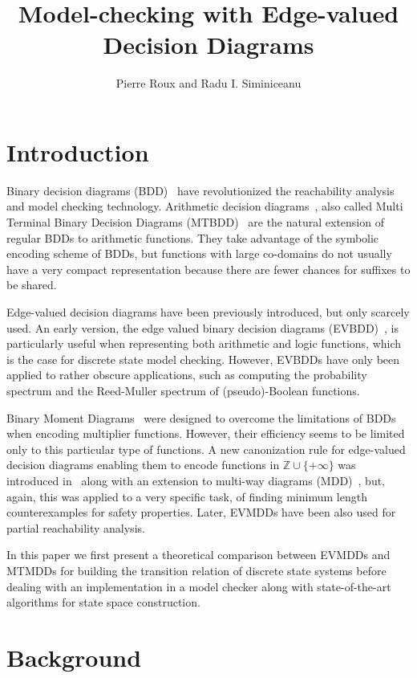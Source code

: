 \documentclass[nocover]             %
{NASA}                       %
\title{Model-checking with Edge-valued Decision Diagrams}
\author{Pierre Roux and Radu I. Siminiceanu}
\newcommand{\Z}{\mathbb{Z}}
\begin{document}
\section{Introduction}

Binary decision diagrams (BDD)~\cite{Bryant1986} have revolutionized the 
reachability analysis and model checking technology.
%
Arithmetic decision diagrams~\cite{Somenzi1993}, also called
Multi Terminal Binary Decision Diagrams (MTBDD)~\cite{Clarke1995} are the 
natural extension of regular BDDs to arithmetic functions.
They take advantage of the symbolic encoding scheme of BDDs, but 
functions with large co-domains do not usually have a very compact 
representation because there are fewer chances for suffixes to be shared.

Edge-valued decision diagrams have been previously introduced, but only 
scarcely used. An early version, the edge valued binary decision 
diagrams (EVBDD)~\cite{Lai1992,Lai1996}, is particularly useful when 
representing both arithmetic and logic functions, which is the case for 
discrete state model checking. However, EVBDDs have only been applied to 
rather obscure applications, such as computing the probability spectrum 
and the Reed-Muller spectrum of (pseudo)-Boolean functions.

Binary Moment Diagrams~\cite{Bryant1994} were designed to overcome the 
limitations of BDDs when encoding multiplier functions. However, their 
efficiency seems to be limited only to this particular type of functions.
%
A new canonization rule for edge-valued decision diagrams enabling them 
to encode functions in $\Z \cup \{+\infty\}$ was introduced 
in~\cite{FMCAD2002} along with an extension to multi-way diagrams 
(MDD)~\cite{Kam1998}, but, again, this was applied to a very specific 
task, of finding minimum length counterexamples for safety properties. 
Later, EVMDDs have been also used for partial reachability analysis.

In this paper we first present a theoretical comparison between EVMDDs 
and MTMDDs for building the transition relation of discrete state 
systems before dealing with an implementation in a model checker along 
with state-of-the-art algorithms for state space construction.

\section{Background}
\end{document}
